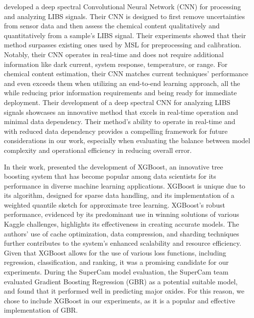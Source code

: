 \citeauthor{castorena_deep_2021} developed a deep spectral Convolutional Neural Network (CNN) for processing and analyzing LIBS signals.
Their CNN is designed to first remove uncertainties from sensor data and then assess the chemical content qualitatively and quantitatively from a sample's LIBS signal.
Their experiments showed that their method surpasses existing ones used by MSL for preprocessing and calibration.
Notably, their CNN operates in real-time and does not require additional information like dark current, system response, temperature, or range.
For chemical content estimation, their CNN matches current techniques' performance and even exceeds them when utilizing an end-to-end learning approach, all the while reducing prior information requirements and being ready for immediate deployment\cite{castorena_deep_2021}.
Their development of a deep spectral CNN for analyzing LIBS signals showcases an innovative method that excels in real-time operation and minimal data dependency. Their method's ability to operate in real-time and with reduced data dependency provides a compelling framework for future considerations in our work, especially when evaluating the balance between model complexity and operational efficiency in reducing overall error.

In their work, \citeauthor{chen_xgboost_2016} presented the development of XGBoost, an innovative tree boosting system that has become popular among data scientists for its performance in diverse machine learning applications. 
XGBoost is unique due to its algorithm, designed for sparse data handling, and its implementation of a weighted quantile sketch for approximate tree learning.
XGBoost's robust performance, evidenced by its predominant use in winning solutions of various Kaggle challenges, highlights its effectiveness in creating accurate models.
The authors' use of cache optimization, data compression, and sharding techniques further contributes to the system's enhanced scalability and resource efficiency\cite{chen_xgboost_2016}.
Given that XGBoost allows for the use of various loss functions, including regression, classification, and ranking, it was a promising candidate for our experiments.
During the SuperCam model evaluation, the SuperCam team evaluated Gradient Boosting Regression (GBR) as a potential suitable model, and found that it performed well in predicting major oxides\cite{andersonPostlandingMajorElement2022}.
For this reason, we chose to include XGBoost in our experiments, as it is a popular and effective implementation of GBR.
